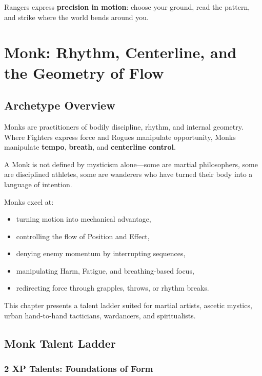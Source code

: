 \documentclass[11pt]{book}
\begin{document}
Rangers express \textbf{precision in motion}:
choose your ground, read the pattern, and strike where the world bends around you.


\chapter{Monk: Rhythm, Centerline, and the Geometry of Flow}

\section{Archetype Overview}

Monks are practitioners of bodily discipline, rhythm, and internal geometry.
Where Fighters express force and Rogues manipulate opportunity,
Monks manipulate \textbf{tempo}, \textbf{breath}, and \textbf{centerline control}.

A Monk is not defined by mysticism alone---some are martial philosophers,
some are disciplined athletes, some are wanderers who have turned their body
into a language of intention.

Monks excel at:
\begin{itemize}
  \item turning motion into mechanical advantage,
  \item controlling the flow of Position and Effect,
  \item denying enemy momentum by interrupting sequences,
  \item manipulating Harm, Fatigue, and breathing-based focus,
  \item redirecting force through grapples, throws, or rhythm breaks.
\end{itemize}

This chapter presents a talent ladder suited for martial artists,
ascetic mystics, urban hand-to-hand tacticians, wardancers,
and spiritualists.

\section{Monk Talent Ladder}

\subsection{2 XP Talents: Foundations of Form}
\end{document}
